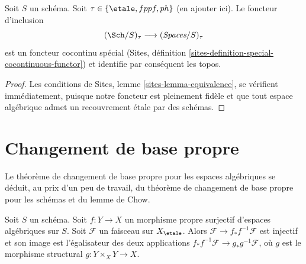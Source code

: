\begin{lemma}
\label{lemma-compare-cohomology-other-topologies}
Soit $S$ un schéma. Soit $\tau \in \{\etale, fppf, ph\}$ (en ajouter ici).
Le foncteur d'inclusion
$$
(\Sch/S)_\tau \longrightarrow (\textit{Spaces}/S)_\tau
$$
est un foncteur cocontinu spécial
(Sites, définition \ref{sites-definition-special-cocontinuous-functor})
et identifie par conséquent les topos.
\end{lemma}

\begin{proof}
Les conditions de Sites, lemme \ref{sites-lemma-equivalence},
se vérifient immédiatement, puisque notre foncteur est pleinement fidèle
et que tout espace algébrique admet un recouvrement étale par des schémas.
\end{proof}







\section{Changement de base propre}
\label{section-proper-base-change}

\noindent
Le théorème de changement de base propre pour les espaces algébriques se déduit,
au prix d'un peu de travail, du théorème de changement de base propre
pour les schémas et du lemme de Chow.

\begin{lemma}
\label{lemma-surjective-proper}
Soit $S$ un schéma. Soit $f : Y \to X$ un morphisme propre surjectif
d'espaces algébriques sur $S$. Soit $\mathcal{F}$ un faisceau sur $X_\etale$.
Alors $\mathcal{F} \to f_*f^{-1}\mathcal{F}$ est injectif et son
image est l'égalisateur des deux applications
$f_*f^{-1}\mathcal{F} \to g_*g^{-1}\mathcal{F}$, où
$g$ est le morphisme structural $g : Y \times_X Y \to X$.
\end{lemma}

